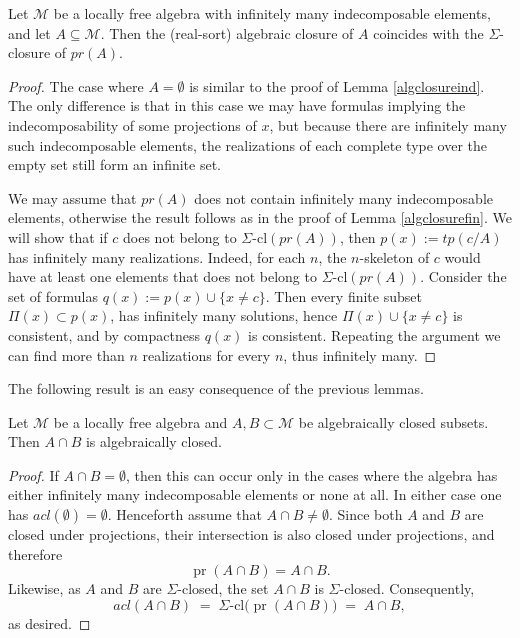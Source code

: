 \documentclass[a4paper,11pt]{article}
\begin{document}
\begin{lemma}\label{algclosureinf}
Let $\mathcal{M}$ be a locally free algebra with infinitely many  indecomposable elements, and let $A\subseteq \mathcal{M}$.
Then the (real-sort) algebraic closure of $A$ coincides with the $\Sigma$-closure of $pr(A)$.
\end{lemma}
\begin{proof}
The case where $A=\emptyset$ is similar to the proof of Lemma \ref{algclosureind}. The only difference is that in this case we may have formulas implying the indecomposability of some projections of $x$, but because there are infinitely many such indecomposable elements, the realizations of each complete type over the empty set still form an infinite set. 


We may assume that $pr(A)$ does not contain infinitely many indecomposable elements, otherwise the result follows as in the proof of Lemma \ref{algclosurefin}. We will show that if $c$ does not belong to $\Sigma\text{-}\mathrm{cl}(pr(A))$, then $p(x):=tp(c/A)$ has infinitely many realizations. Indeed, for each $n$, the $n$-skeleton of $c$ would have at least one elements that does not belong to $\Sigma\text{-}\mathrm{cl}(pr(A))$. Consider the set of formulas $q(x):=p(x)\cup \{x\neq c\}$. Then every finite subset $\Pi(x)\subset p(x)$, has infinitely many solutions, hence $\Pi(x)\cup \{x\neq c\}$ is consistent, and by compactness $q(x)$ is consistent. Repeating the argument we can find more than $n$ realizations for every $n$, thus infinitely many.  
\end{proof}

The following result is an easy consequence of the previous lemmas. 

\begin{corollary}\label{algclosurecap}
Let $\mathcal{M}$ be a locally free algebra and $A, B\subset \mathcal{M}$ be algebraically closed subsets. Then $A\cap B$ is algebraically closed.  
\end{corollary}
\begin{proof}
If $A\cap B=\emptyset$, then this can occur only in the cases where the algebra has either infinitely many indecomposable elements or none at all. In either case one has $acl(\emptyset)=\emptyset$. Henceforth assume that $A\cap B\neq\emptyset$. Since both $A$ and $B$ are closed under projections, their intersection is also closed under projections, and therefore
\[
\operatorname{pr}(A\cap B)=A\cap B.
\]
Likewise, as $A$ and $B$ are $\Sigma$-closed, the set $A\cap B$ is $\Sigma$-closed. Consequently,
\[
acl(A\cap B)\;=\;\Sigma\text{-}\mathrm{cl}\bigl(\operatorname{pr}(A\cap B)\bigr)\;=\;A\cap B,
\]
as desired.
 
\end{proof}
\end{document}
